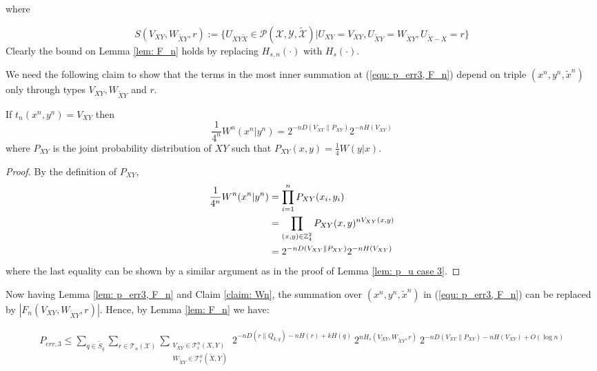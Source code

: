 where

\begin{equation}\label{equ: H_S}
S(V_{XY},W_{\tilde{X}Y},r):=\{ U_{XY\tilde{X}} \in \mathcal{P}(\mathcal{X},\mathcal{Y},\tilde{\mathcal{X}})| U_{XY}=V_{XY}, U_{\tilde{X}Y}=W_{\tilde{X}Y}, U_{\tilde{X}-X}=r\}
\end{equation}
Clearly the bound on Lemma \ref{lem: F_n} holds by replacing $H_{s,n}(\cdot)$ with $H_s(\cdot)$.

We need the following claim to show that the terms in the most inner summation at (\ref{equ: p_err3, F_n}) depend on triple $(x^n,y^n,\tilde{x}^n)$ only through types $V_{XY},W_{\tilde{X}Y}$ and $r$.

\begin{claim}\label{claim: Wn}
If $t_n(x^n,y^n)=V_{XY}$ then 
\begin{equation*}
\frac{1}{4^n}W^n(x^n|y^n) = 2^{-nD(V_{XY}\| P_{XY})} 2^{-nH(V_{XY})} 
\end{equation*}
where $P_{XY}$ is the joint probability distribution of $XY$ such that $P_{XY}(x,y)=\frac{1}{4}W(y|x)$.

\end{claim}

\begin{proof}
By the definition of $P_{XY}$,
\begin{align*}
\frac{1}{4^n}W^n(x^n|y^n)&=\prod_{i=1}^nP_{XY}(x_i,y_i)\\
&=\prod_{(x,y)\in \mathbb{Z}_4^2}P_{XY}(x,y)^{nV_{XY}(x,y)}\\
&= 2^{-nD(V_{XY}\| P_{XY})} 2^{-nH(V_{XY})}
\end{align*}
where the last equality can be shown by a similar argument as in the proof of Lemma \ref{lem: p_u case 3}.
\end{proof}


Now having Lemma \ref{lem: p_err3, F_n} and Claim \ref{claim: Wn},  the summation over $(x^n,y^n,\tilde{x}^n)$ in (\ref{equ: p_err3, F_n}) can be replaced by  $| F_n(V_{XY},W_{\tilde{X}Y},r) | $. Hence, by Lemma \ref{lem: F_n} we have:

\begin{align} \label{equ: p_err3, V_XY,W_XY}
P_{err,3}\leq \sum_{q\in \tilde{S}_q}\sum_{r\in\mathcal{T}_n(\mathcal{X}) } \sum_{\substack{V_{XY}\in \mathcal{T}_\epsilon^n(X,Y)\\ W_{\tilde{X}Y}\in  \mathcal{T}_\epsilon^n(\tilde{X},Y) }} 2^{-nD(r\| Q_{k,q})-nH(r)+kH(q)} ~2^{nH_s(V_{XY},W_{\tilde{X}Y},r)}~ 2^{-nD(V_{XY}\| P_{XY})-nH(V_{XY})+O(\log n)}
\end{align}


